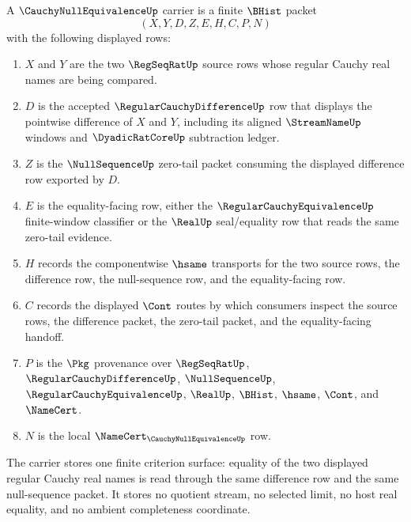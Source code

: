 \begin{definition}
\label{def:cauchy-null-equivalence-carrier}
A $\CauchyNullEquivalenceUp$ carrier is a finite $\BHist$ packet
$$
(X,Y,D,Z,E,H,C,P,N)
$$
with the following displayed rows:
\begin{enumerate}
\item $X$ and $Y$ are the two $\RegSeqRatUp$ source rows whose regular Cauchy real names are being compared.
\item $D$ is the accepted $\RegularCauchyDifferenceUp$ row that displays the pointwise difference of $X$ and $Y$, including its aligned $\StreamNameUp$ windows and $\DyadicRatCoreUp$ subtraction ledger.
\item $Z$ is the $\NullSequenceUp$ zero-tail packet consuming the displayed difference row exported by $D$.
\item $E$ is the equality-facing row, either the $\RegularCauchyEquivalenceUp$ finite-window classifier or the $\RealUp$ seal/equality row that reads the same zero-tail evidence.
\item $H$ records the componentwise $\hsame$ transports for the two source rows, the difference row, the null-sequence row, and the equality-facing row.
\item $C$ records the displayed $\Cont$ routes by which consumers inspect the source rows, the difference packet, the zero-tail packet, and the equality-facing handoff.
\item $P$ is the $\Pkg$ provenance over $\RegSeqRatUp$, $\RegularCauchyDifferenceUp$, $\NullSequenceUp$, $\RegularCauchyEquivalenceUp$, $\RealUp$, $\BHist$, $\hsame$, $\Cont$, and $\NameCert$.
\item $N$ is the local $\NameCert_{\CauchyNullEquivalenceUp}$ row.
\end{enumerate}
The carrier stores one finite criterion surface: equality of the two displayed regular Cauchy real names is read through the same difference row and the same null-sequence packet. It stores no quotient stream, no selected limit, no host real equality, and no ambient completeness coordinate.
\end{definition}

